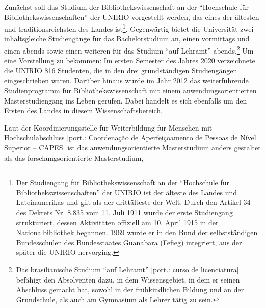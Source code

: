 \documentclass[a4paper,
fontsize=11pt,
oneside,
numbers=noperiodatend,
parskip=half-,
bibliography=totoc,
final
]{scrartcl}
\begin{document}
Zunächst soll das Studium der Bibliothekswissenschaft an der
\enquote{Hochschule für Bibliothekswissenschaften} der UNIRIO
vorgestellt werden, das eines der ältesten und traditionsreichsten des
Landes ist\footnote{Der Studiengang für Bibliothekswissenschaft an der
  \enquote{Hochschule für Bibliothekswissenschaften} der UNIRIO ist der
  älteste des Landes und Lateinamerikas und gilt als der drittälteste
  der Welt. Durch den Artikel 34 des Dekrets Nr. 8.835 vom 11. Juli 1911
  wurde der erste Studiengang strukturiert, dessen Aktivitäten offiziell
  am 10. April 1915 in der Nationalbibliothek begannen. 1969 wurde er in
  den Bund der selbstständigen Bundesschulen des Bundesstaates Guanabara
  (Fefieg) integriert, aus der später die UNIRIO hervorging.}.
Gegenwärtig bietet die Universität zwei inhaltsgleiche Studiengänge für
das Bachelorstudium an, einen vormittags und einen abends sowie einen
weiteren für das Studium \enquote{auf Lehramt} abends.\footnote{Das
  brasilianische Studium \enquote{auf Lehramt} {[}port.: curso de
  licenciatura{]} befähigt den Absolventen dazu, in dem Wissensgebiet,
  in dem er seinen Abschluss gemacht hat, sowohl in der frühkindlichen
  Bildung und an der Grundschule, als auch am Gymnasium als Lehrer tätig
  zu sein.} Um eine Vorstellung zu bekommen: Im ersten Semester des
Jahres 2020 verzeichnete die UNIRIO 816 Studenten, die in den drei
grundständigen Studiengängen eingeschrieben waren. Darüber hinaus wurde
im Jahr 2012 das weiterführende Studienprogramm für
Bibliothekswissenschaft mit einem anwendungsorientierten
Masterstudiengang ins Leben gerufen. Dabei handelt es sich ebenfalls um
den Ersten des Landes in diesem Wissenschaftsbereich.

Laut der Koordinierungsstelle für Weiterbildung für Menschen mit
Hochschulabschluss {[}port.: Coordenação de Aperfeiçoamento de Pessoas
de Nível Superior -- CAPES{]} ist das anwendungsorientierte
Masterstudium anders gestaltet als das forschungsorientierte
Masterstudium,
\end{document}
